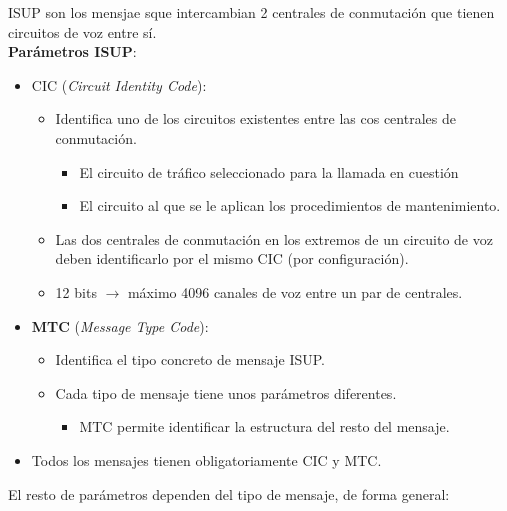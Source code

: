 \documentclass[10pt,portrait, twocolumn]{article}
\begin{document}
ISUP son los mensjae sque intercambian 2 centrales de conmutación que tienen circuitos de voz entre sí.\\


\textbf{Parámetros ISUP}:

	\begin{itemize}
	\item CIC (\textit{Circuit Identity Code}):
		\begin{itemize}
		\item Identifica uno de los circuitos existentes entre las cos centrales de conmutación.
			\begin{itemize}
			\item El circuito de tráfico seleccionado para la llamada en cuestión
			\item El circuito al que se le aplican los procedimientos de mantenimiento.
			\end{itemize}
		\item Las dos centrales de conmutación en los extremos de un circuito de voz deben identificarlo por el mismo CIC (por configuración).
		\item 12 bits $\rightarrow$ máximo 4096 canales de voz entre un par de centrales.
		\end{itemize}
	\item \textbf{MTC} (\textit{Message Type Code}):
		\begin{itemize}
		\item Identifica el tipo concreto de mensaje ISUP.
		\item Cada tipo de mensaje tiene unos parámetros diferentes.
			\begin{itemize}
			\item MTC permite identificar la estructura del resto del mensaje.
			\end{itemize} 
		\end{itemize} 
	\item Todos los mensajes tienen obligatoriamente CIC y MTC.
	\end{itemize}

El resto de parámetros dependen del tipo de mensaje, de forma general:
\end{document}
